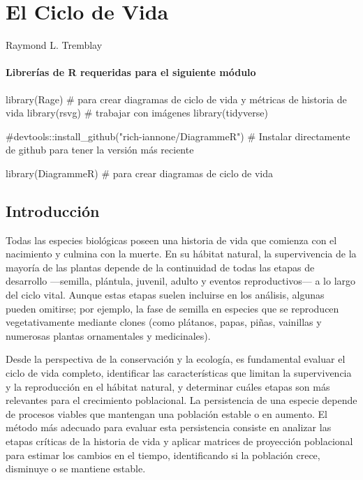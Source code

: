 \documentclass[
  12pt,
  letterpaper,
]{book}
\author{}
\date{}
\newenvironment{Shaded}{\begin{snugshade}}{\end{snugshade}}
\newcommand{\CommentTok}[1]{\textcolor[rgb]{0.37,0.37,0.37}{#1}}
\newcommand{\FunctionTok}[1]{\textcolor[rgb]{0.28,0.35,0.67}{#1}}
\newcommand{\NormalTok}[1]{\textcolor[rgb]{0.00,0.23,0.31}{#1}}
\renewcommand*\contentsname{Table of contents}
\newcommand\contentsname{Table of contents}
\begin{document}
\frontmatter

\renewcommand*\contentsname{Table of contents}
{
\hypersetup{linkcolor=}
\setcounter{tocdepth}{2}
\tableofcontents
}

\mainmatter
\chapter{El Ciclo de Vida}\label{Ciclo_Vida}

Raymond L. Tremblay

\subsubsection{Librerías de R requeridas para el siguiente
módulo}\label{libreruxedas-de-r-requeridas-para-el-siguiente-muxf3dulo}

\begin{Shaded}
\begin{Highlighting}[]
\FunctionTok{library}\NormalTok{(Rage) }\CommentTok{\# para crear diagramas de ciclo de vida y métricas de historia de vida }
\FunctionTok{library}\NormalTok{(rsvg) }\CommentTok{\# trabajar con imágenes }
\FunctionTok{library}\NormalTok{(tidyverse)}

\CommentTok{\#devtools::install\_github("rich{-}iannone/DiagrammeR") \# Instalar directamente de github para tener la versión más reciente}

\FunctionTok{library}\NormalTok{(DiagrammeR) }\CommentTok{\# para crear diagramas de ciclo de vida}
\end{Highlighting}
\end{Shaded}

\section{Introducción}\label{introducciuxf3n}

Todas las especies biológicas poseen una historia de vida que comienza
con el nacimiento y culmina con la muerte. En su hábitat natural, la
supervivencia de la mayoría de las plantas depende de la continuidad de
todas las etapas de desarrollo ---semilla, plántula, juvenil, adulto y
eventos reproductivos--- a lo largo del ciclo vital. Aunque estas etapas
suelen incluirse en los análisis, algunas pueden omitirse; por ejemplo,
la fase de semilla en especies que se reproducen vegetativamente
mediante clones (como plátanos, papas, piñas, vainillas y numerosas
plantas ornamentales y medicinales).

Desde la perspectiva de la conservación y la ecología, es fundamental
evaluar el ciclo de vida completo, identificar las características que
limitan la supervivencia y la reproducción en el hábitat natural, y
determinar cuáles etapas son más relevantes para el crecimiento
poblacional. La persistencia de una especie depende de procesos viables
que mantengan una población estable o en aumento. El método más adecuado
para evaluar esta persistencia consiste en analizar las etapas críticas
de la historia de vida y aplicar matrices de proyección poblacional para
estimar los cambios en el tiempo, identificando si la población crece,
disminuye o se mantiene estable.
\end{document}
